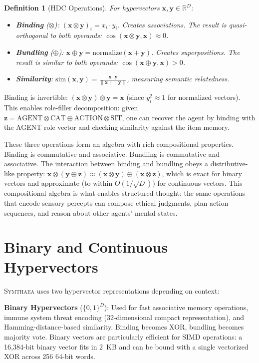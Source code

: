 \documentclass[12pt]{book}
\newtheorem{definition}[theorem]{Definition}
\newcommand{\bind}{\otimes}
\newcommand{\bundle}{\oplus}
\newcommand{\symthaea}{\textsc{Symthaea}}
\newcommand{\R}{\mathbb{R}}
\begin{document}
\begin{definition}[HDC Operations]\label{def:hdc-ops}
For hypervectors $\mathbf{x}, \mathbf{y} \in \R^D$:
\begin{itemize}
  \item \textbf{Binding} ($\bind$): $(\mathbf{x} \bind \mathbf{y})_i = x_i \cdot y_i$. Creates associations. The result is quasi-orthogonal to both operands: $\cos(\mathbf{x} \bind \mathbf{y}, \mathbf{x}) \approx 0$.
  \item \textbf{Bundling} ($\bundle$): $\mathbf{x} \bundle \mathbf{y} = \text{normalize}(\mathbf{x} + \mathbf{y})$. Creates superpositions. The result is similar to both operands: $\cos(\mathbf{x} \bundle \mathbf{y}, \mathbf{x}) > 0$.
  \item \textbf{Similarity}: $\text{sim}(\mathbf{x}, \mathbf{y}) = \frac{\mathbf{x} \cdot \mathbf{y}}{\|\mathbf{x}\| \|\mathbf{y}\|}$, measuring semantic relatedness.
\end{itemize}
\end{definition}

Binding is invertible: $(\mathbf{x} \bind \mathbf{y}) \bind \mathbf{y} = \mathbf{x}$ (since $y_i^2 \approx 1$ for normalized vectors). This enables role-filler decomposition: given $\mathbf{z} = \text{AGENT} \bind \text{CAT} \bundle \text{ACTION} \bind \text{SIT}$, one can recover the agent by binding with the AGENT role vector and checking similarity against the item memory.

These three operations form an algebra with rich compositional properties. Binding is commutative and associative. Bundling is commutative and associative. The interaction between binding and bundling obeys a distributive-like property: $\mathbf{x} \bind (\mathbf{y} \bundle \mathbf{z}) \approx (\mathbf{x} \bind \mathbf{y}) \bundle (\mathbf{x} \bind \mathbf{z})$, which is exact for binary vectors and approximate (to within $O(1/\sqrt{D})$) for continuous vectors. This compositional algebra is what enables structured thought: the same operations that encode sensory percepts can compose ethical judgments, plan action sequences, and reason about other agents' mental states.

\section{Binary and Continuous Hypervectors}

\symthaea{} uses two hypervector representations depending on context:

\textbf{Binary Hypervectors} ($\{0,1\}^D$): Used for fast associative memory operations, immune system threat encoding (32-dimensional compact representation), and Hamming-distance-based similarity. Binding becomes XOR, bundling becomes majority vote. Binary vectors are particularly efficient for SIMD operations: a 16,384-bit binary vector fits in 2~KB and can be bound with a single vectorized XOR across 256 64-bit words.
\end{document}

